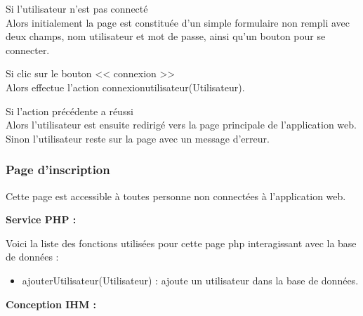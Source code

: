 			\begin{paragraphe}
				Si l'utilisateur n'est pas connecté \\
				Alors initialement la page est constituée d'un simple formulaire non rempli avec deux champs, nom utilisateur et mot de passe, ainsi qu'un bouton pour se connecter.
			\end{paragraphe}


			\begin{paragraphe}
				Si clic sur le bouton << connexion >> \\
				Alors effectue l'action connexionutilisateur(Utilisateur).
			\end{paragraphe}

			\begin{paragraphe}
				Si l'action précédente a réussi \\
				Alors l'utilisateur est ensuite redirigé vers la page principale de l'application web.
				Sinon l'utilisateur reste sur la page avec un message d'erreur.
			\end{paragraphe}

		\subsubsection{Page d'inscription}

			\begin{paragraphe}
				Cette page est accessible à toutes personne non connectées à l'application web.
			\end{paragraphe}

			\begin{paragraphe}
				\textbf{Service PHP :}
			\end{paragraphe}

			\begin{paragraphe}
				Voici la liste des fonctions utilisées pour cette page php interagissant avec la base de données :
				\begin{itemize}
					\item ajouterUtilisateur(Utilisateur) : ajoute un utilisateur dans la base de données.
				\end{itemize}
			\end{paragraphe}

			\begin{paragraphe}
				\textbf{Conception IHM :}
			\end{paragraphe}

